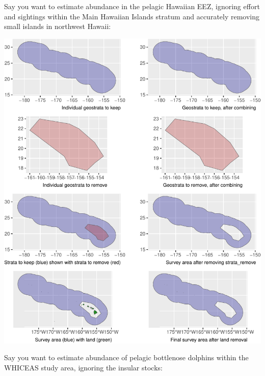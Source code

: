 \documentclass[
]{book}
\newenvironment{Shaded}{\begin{snugshade}}{\end{snugshade}}
\newcommand{\AttributeTok}[1]{\textcolor[rgb]{0.77,0.63,0.00}{#1}}
\newcommand{\ConstantTok}[1]{\textcolor[rgb]{0.00,0.00,0.00}{#1}}
\newcommand{\FunctionTok}[1]{\textcolor[rgb]{0.00,0.00,0.00}{#1}}
\newcommand{\NormalTok}[1]{#1}
\newcommand{\OtherTok}[1]{\textcolor[rgb]{0.56,0.35,0.01}{#1}}
\newcommand{\SpecialCharTok}[1]{\textcolor[rgb]{0.00,0.00,0.00}{#1}}
\newcommand{\StringTok}[1]{\textcolor[rgb]{0.31,0.60,0.02}{#1}}
\begin{document}
Say you want to estimate abundance in the pelagic Hawaiian EEZ, ignoring effort and sightings within the Main Hawaiian Islands stratum and accurately removing small islands in northwest Hawaii:

\begin{Shaded}
\end{Shaded}

\includegraphics{figures/unnamed-chunk-254-1.pdf}

Say you want to estimate abundance of pelagic bottlenose dolphins within the WHICEAS study area, ignoring the insular stocks:
\end{document}
